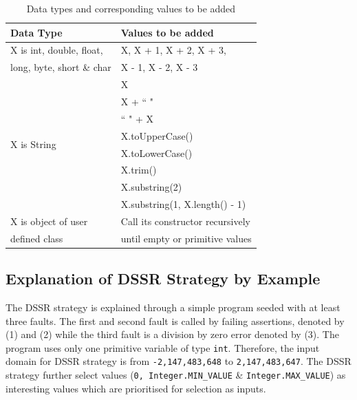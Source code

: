 \bigskip
\bigskip
\bigskip
\begin{table}[ht]
\caption{Data types and corresponding values to be added} %
\bigskip
\centering %
{\renewcommand{\arraystretch}{1.6} 
\begin{tabular}{| l | l |} %
\hline\hline %
Data Type & Values to be added\\ [0.5ex] %
\hline %
\multirow{1}{*}{X is int, double, float, } & X,  X + 1, X + 2, X + 3,  \\ %
\multirow{1}{*}{long, byte, short \& char} & X - 1, X - 2, X - 3 \\ 

\hline
\multirow{8}{*}{X is String} & X\\ %

& X + ``  "\\ %
& ``  " + X \\ %
& X.toUpperCase() \\
& X.toLowerCase() \\
& X.trim() \\
& X.substring(2) \\
& X.substring(1, X.length() - 1) \\
\hline
\multirow{1}{*}{X is object of user} & Call its constructor recursively \\ %
\multirow{1}{*}{defined class} & until empty or primitive values \\[1ex]
\hline
\hline %
\end{tabular}
}
\bigskip
\label{table:addvalues2} %
\end{table}
\bigskip
\bigskip
\newpage



\subsection{Explanation of DSSR Strategy by Example}
The DSSR strategy is explained through a simple program seeded with at least three faults. The first and second fault is called by failing assertions, denoted by (1) and (2) while the third fault is a division by zero error denoted by (3). The program uses only one primitive variable of type \verb+int+. Therefore, the input domain for DSSR strategy is from \verb+-2,147,483,648+ to \verb+2,147,483,647+. The DSSR strategy further select values (\verb+0, Integer.MIN_VALUE+ \& \verb+Integer.MAX_VALUE+) as interesting values which are prioritised for selection as inputs. 

